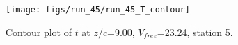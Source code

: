 \begin{figure}[H]
\centering
\texttt{[image: figs/run\_45/run\_45\_T\_contour]}
\caption{Contour plot of $\overline{t}$ at $z/c$=9.00, $V_{free}$=23.24, station 5.}
\label{fig:run_45_T_contour}
\end{figure}


